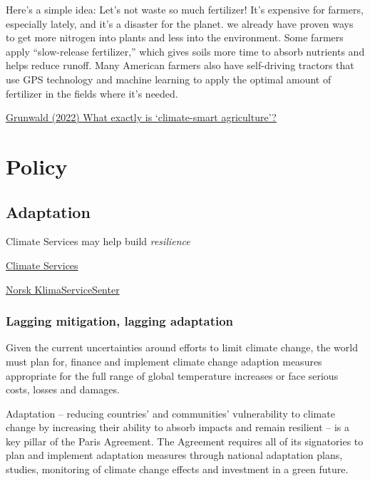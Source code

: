 \documentclass[
]{book}
\begin{document}
Here's a simple idea: Let's not waste so much fertilizer! It's expensive for farmers, especially lately, and it's a disaster for the planet.
we already have proven ways to get more nitrogen into plants and less into the environment. Some farmers apply \hspace{0pt}``slow-release fertilizer,'' which gives soils more time to absorb nutrients and helps reduce runoff. Many American farmers also have self-driving tractors that use GPS technology and machine learning to apply the optimal amount of fertilizer in the fields where it's needed.

\href{https://www.canarymedia.com/articles/food-and-farms/what-exactly-is-climate-smart-agriculture}{Grunwald (2022) What exactly is \hspace{0pt}`climate-smart agriculture'?}

\hypertarget{part-policy}{%
\part{Policy}\label{part-policy}}

\hypertarget{adaptation}{%
\chapter{Adaptation}\label{adaptation}}

Climate Services may help build \emph{resilience}

\href{https://gfcs.wmo.int/}{Climate Services}

\href{https://klimaservicesenter.no/faces/desktop/index.xhtml}{Norsk KlimaServiceSenter}

\hypertarget{lagging-mitigation-lagging-adaptation}{%
\section{Lagging mitigation, lagging adaptation}\label{lagging-mitigation-lagging-adaptation}}

Given the current uncertainties around efforts to limit climate change,
the world must plan for, finance and implement climate change adaption measures
appropriate for the full range of global temperature increases or
face serious costs, losses and damages.

Adaptation -- reducing countries' and communities' vulnerability to climate change
by increasing their ability to absorb impacts and remain resilient --
is a key pillar of the Paris Agreement.
The Agreement requires all of its signatories to plan and implement adaptation measures
through national adaptation plans, studies, monitoring of climate change effects and
investment in a green future.
\end{document}
